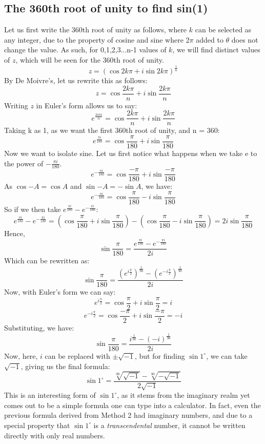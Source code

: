 \documentclass[12pt]{article}
\begin{document}
\subsection{The 360th root of unity to find sin(1)}
Let us first write the 360th root of unity as follows, where $k$ can be selected as any integer, due to the property of cosine and sine where 2$\pi$ added to $\theta$ does not change the value. As such, for 0,1,2,3...n-1 values of $k$, we will find distinct values of $z$, which will be seen for the 360th root of unity.
\[
z = (\cos{2k\pi} + i \sin{2k\pi})^{\frac{1}{n}}
\]
By De Moivre's, let us rewrite this as follows:
\[
z = \cos{\frac{2k\pi}{n}} + i \sin{\frac{2k\pi}{n}}
\]
Writing $z$ in Euler's form allows us to say:
\[
e^{\frac{2\pi ki}{n}} = \cos{\frac{2k\pi}{n}} + i \sin{\frac{2k\pi}{n}}
\]
Taking k as 1, as we want the first 360th root of unity, and n = 360:
\[
e^{\frac{\pi i}{180}} = \cos{\frac{\pi}{180}} + i \sin{\frac{\pi}{180}}
\]
Now we want to isolate sine. Let us first notice what happens when we take e to the power of $-\frac{\pi i}{180}$.
\[
e^{-\frac{\pi i}{180}} = \cos{\frac{-\pi}{180}} + i \sin{\frac{-\pi}{180}}
\]
As $\cos{-A}=\cos{A}$ and $\sin{-A}=-\sin{A}$, we have:
\[
e^{-\frac{\pi i}{180}} = \cos{\frac{\pi}{180}} - i \sin{\frac{\pi}{180}}
\]
So if we then take $e^{\frac{\pi i}{180}} - e^{-\frac{\pi i}{180}}$:
\[
e^{\frac{\pi i}{180}} - e^{-\frac{\pi i}{180}} = (\cos{\frac{\pi}{180}} + i \sin{\frac{\pi}{180}})-(\cos{\frac{\pi}{180}} - i \sin{\frac{\pi}{180}}) = 2i\sin{\frac{\pi}{180}}
\]
Hence,
\[
\sin{\frac{\pi}{180}} = \frac{e^{\frac{\pi i}{180}} - e^{-\frac{\pi i}{180}}}{2i}
\]
Which can be rewritten as:
\[
\sin{\frac{\pi}{180}} = \frac{(e^{i\frac{\pi}{2}})^{\frac{1}{90}} - (e^{-i\frac{\pi}{2}})^{\frac{1}{90}}}{2i}
\]
Now, with Euler's form we can say:
\[
e^{i\frac{\pi}{2}} = \cos{\frac{\pi}{2}} + i\sin{\frac{\pi}{2}} = i
\]
\[
e^{-i\frac{\pi}{2}} = \cos{\frac{-\pi}{2}} + i\sin{\frac{-\pi}{2}} = -i
\]
Substituting, we have:
\[
\sin{\frac{\pi}{180}} = \frac{i^{\frac{1}{90}} - (-i)^{\frac{1}{90}}}{2i}
\]
Now, here, $i$ can be replaced with $\pm \sqrt{-1}$, but for finding $\sin{1^{\circ}}$, we can take $\sqrt{-1}$, giving us the final formula:
\[
\sin{1^{\circ}} = \frac{\sqrt[90]{\sqrt{-1}} - \sqrt[90]{-\sqrt{-1}}}{2\sqrt{-1}}
\]
This is an interesting form of $\sin{1^{\circ}}$, as it stems from the imaginary realm yet comes out to be a simple formula one can type into a calculator. In fact, even the previous formula derived from Method 2 had imaginary numbers, and due to a special property that $\sin{1^{\circ}}$ is a \textit{transcendental} number, it cannot be written directly with only real numbers. 
\pagebreak
\end{document}
